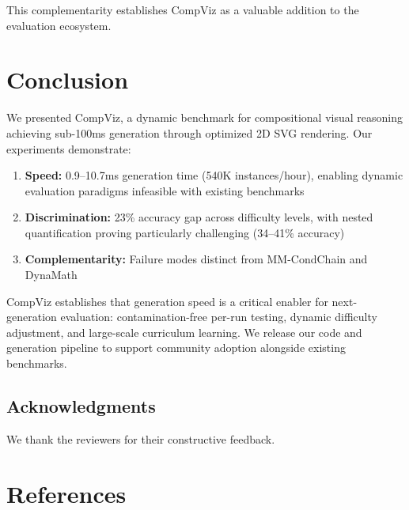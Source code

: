 \documentclass[11pt,a4paper]{article}
\begin{document}
This complementarity establishes CompViz as a valuable addition to the evaluation ecosystem.

\section{Conclusion}

We presented CompViz, a dynamic benchmark for compositional visual reasoning achieving sub-100ms generation through optimized 2D SVG rendering. Our experiments demonstrate:

\begin{enumerate}
    \item \textbf{Speed:} 0.9--10.7ms generation time (540K instances/hour), enabling dynamic evaluation paradigms infeasible with existing benchmarks
    \item \textbf{Discrimination:} 23\% accuracy gap across difficulty levels, with nested quantification proving particularly challenging (34--41\% accuracy)
    \item \textbf{Complementarity:} Failure modes distinct from MM-CondChain and DynaMath
\end{enumerate}

CompViz establishes that generation speed is a critical enabler for next-generation evaluation: contamination-free per-run testing, dynamic difficulty adjustment, and large-scale curriculum learning. We release our code and generation pipeline to support community adoption alongside existing benchmarks.

\subsection*{Acknowledgments}

We thank the reviewers for their constructive feedback.

\section*{References}
\end{document}

